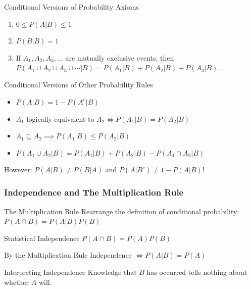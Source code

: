 \documentclass{beamer}
\begin{document}
\begin{frame}
  \small
  \begin{block}{Conditional Versions of Probability Axioms}
    \begin{enumerate}
      \item $0 \leq P(A|B) \leq 1$
      \item $P(B|B) = 1$
      \item If $A_1, A_2, A_3, \dots$ are mutually exclusive events, then $P(A_1\cup A_2\cup A_3 \cup \cdots|B) = P(A_1|B) + P(A_2|B) + P(A_3|B)\dots$
    \end{enumerate}
  \end{block}

  \begin{block}{Conditional Versions of Other Probability Rules}
    \begin{itemize}
      \item $P(A|B) = 1 - P(A^c|B)$
      \item $A_1$ logically equivalent to $A_2 \iff P(A_1|B) = P(A_2|B)$
      \item $A_1 \subseteq A_2 \implies P(A_1|B) \leq P(A_2|B)$  
      \item $P(A_1 \cup A_2 | B) = P(A_1|B) + P(A_2|B) - P(A_1 \cap A_2|B)$
    \end{itemize}
  \end{block}


    \alert{However: $P(A|B) \neq P(B|A)$ and $P(A|B^c) \neq 1 - P(A|B)$!}
  
\end{frame}
\begin{frame}
\frametitle{Independence and The Multiplication Rule}
\begin{block}{The Multiplication Rule}
Rearrange the definition of conditional probability:
$P(A\cap B) = P(A|B)P(B)$
\end{block}\pause
\begin{block}{Statistical Independence}
$P(A\cap B) = P(A)P(B)$
\end{block}\pause
\begin{alertblock}{By the Multiplication Rule}
$\mbox{Independence } \iff P(A|B) = P(A)$\\
\end{alertblock}\pause
\begin{block}{Interpreting Independence}
Knowledge that $B$ has occurred tells nothing about whether $A$ will.
\end{block}
\end{frame}
\end{document}
